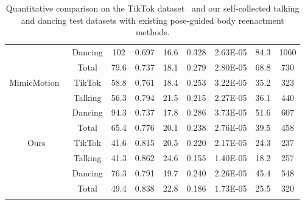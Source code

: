 \begin{table*}[htb]
\begin{tabular}{c|c|ccccc|cc}
       & Dancing              & 102 & 0.697              & 16.6& 0.328              & 2.63E-05 & 84.3 & 1060              \\ 
       &\cellcolor[HTML]{F0F0F0} Total &\cellcolor[HTML]{F0F0F0} 79.6& \cellcolor[HTML]{F0F0F0} 0.737    &\cellcolor[HTML]{F0F0F0} \cellcolor[HTML]{F0F0F0} 18.1&\cellcolor[HTML]{F0F0F0} 0.279              &\cellcolor[HTML]{F0F0F0} 2.80E-05        &\cellcolor[HTML]{F0F0F0} 68.8   &\cellcolor[HTML]{F0F0F0} 730\\ \hline
\multirow{4}{*}{MimicMotion~\cite{zhang2024mimicmotion}}           & TikTok              & 58.8  & 0.761    & 18.4  & 0.253  & 3.22E-05 & 35.2 & 323   \\ 
       & Talking & 56.3  & 0.794    & 21.5  & 0.215  & 2.27E-05 & 36.1 & 440   \\ 
       & Dancing              & 94.3& 0.737              & 17.8& 0.286              & 3.73E-05   & 51.6        & 607\\ 
       &\cellcolor[HTML]{F0F0F0} Total &\cellcolor[HTML]{F0F0F0} 65.4& \cellcolor[HTML]{F0F0F0} 0.776              &\cellcolor[HTML]{F0F0F0} 20.1&\cellcolor[HTML]{F0F0F0} 0.238              & \cellcolor[HTML]{F0F0F0} 2.76E-05  &\cellcolor[HTML]{F0F0F0} 39.5         &\cellcolor[HTML]{F0F0F0} 458\\ \hline
\multirow{4}{*}{Ours}            & TikTok              & 41.6 & 0.815              & 20.5 & 0.220             & 2.17E-05     & 24.3     & 237\\ 
       & Talking & 41.3 & 0.862              & 24.6 & 0.155              & 1.40E-05  &  18.2       & 257\\ 
       & Dancing              & 76.3  & 0.791    & 19.7 & 0.240              & 2.26E-05  &  45.4       & 548              \\ 
       & \cellcolor[HTML]{D9D9D9} Total& \cellcolor[HTML]{D9D9D9} 49.4 & \cellcolor[HTML]{D9D9D9} 0.838              & \cellcolor[HTML]{D9D9D9} 22.8  & \cellcolor[HTML]{D9D9D9} 0.186            & \cellcolor[HTML]{D9D9D9} 1.73E-05  & \cellcolor[HTML]{D9D9D9} 25.5         & \cellcolor[HTML]{D9D9D9} 320\\ \Xhline{1pt}

\end{tabular}
\vspace{-0.1in}
\caption{Quantitative comparison on the TikTok dataset~\cite{jafarian2021learning} and our self-collected talking and dancing test datasets with existing pose-guided body reenactment methods. }
\vspace{-0.1in}
\label{tab:metrics-total}
\end{table*}

